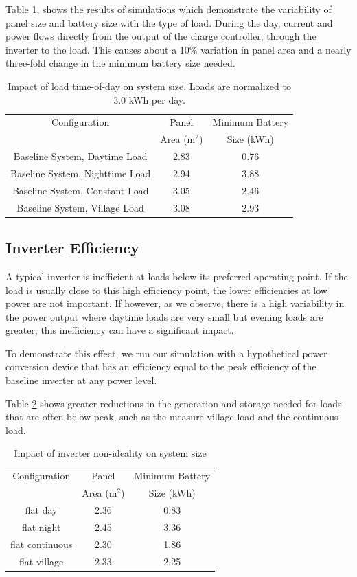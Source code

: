 \documentclass[conference]{IEEEtran}
\begin{document}
Table \ref{load_type_impact}, shows the results of simulations
which demonstrate the variability of panel size and battery
size with the type of load.
During the day, current and power flows directly from the output of
the charge controller, through the inverter to the load.
This causes about a 10\% variation in panel area and a
nearly three-fold change in the minimum battery size needed.

\begin{table}
\centering
\begin{tabular}{c c c}
Configuration & Panel          & Minimum Battery \\
              & Area (m$^2$)   & Size (kWh)      \\
\hline
Baseline System, Daytime Load   & 2.83 & 0.76 \\
Baseline System, Nighttime Load & 2.94 & 3.88 \\
Baseline System, Constant Load  & 3.05 & 2.46 \\
Baseline System, Village Load   & 3.08 & 2.93 \\
\end{tabular}
\caption{Impact of load time-of-day on system size.
Loads are normalized to 3.0 kWh per day.}
\label{load_type_impact}
\end{table}

\subsection{Inverter Efficiency}

A typical inverter is inefficient at loads below its
preferred operating point.
If the load is usually close to this high efficiency
point, the lower efficiencies at low power are not important.
If however, as we observe, there is a high variability
in the power output where daytime loads are very small
but evening loads are greater, this inefficiency can have
a significant impact.

To demonstrate this effect, we run our simulation with
a hypothetical power conversion device that has an
efficiency equal to the peak efficiency of the baseline
inverter at any power level.

Table \ref{table_inverter} shows greater reductions
in the generation and storage needed for loads that
are often below peak, such as the measure village load
and the continuous load.

\begin{table}
\centering
\begin{tabular}{c c c}
Configuration & Panel          & Minimum Battery \\
              & Area (m$^2$)   & Size (kWh)      \\
\hline
flat day        & 2.36 & 0.83 \\
flat night      & 2.45 & 3.36 \\
flat continuous & 2.30 & 1.86 \\
flat village    & 2.33 & 2.25 \\
\end{tabular}
\caption{Impact of inverter non-ideality on system size}
\label{table_inverter}
\end{table}
\end{document}
